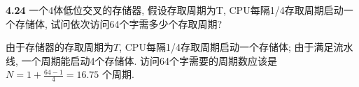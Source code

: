 \documentclass[UTF8]{report}
\newcommand{\problem}[1]{{\setlength{\parskip}{10pt}\noindent \bf{#1}}}
\newenvironment{solution}{{\noindent\hskip 2em \bf 解 \quad}}{}
\begin{document}
\problem{4.24} 一个4体低位交叉的存储器, 假设存取周期为T, CPU每隔1/4存取周期启动一个存储体, 试问依次访问64个字需多少个存取周期?

\begin{solution}
    由于存储器的存取周期为$T$, CPU每隔1/4存取周期启动一个存储体; 由于满足流水线, 一个周期能启动4个存储体. 访问64个字需要的周期数应该是 $N = 1 + \frac{64-1}{4} = 16.75$ 个周期.
\end{solution}
\end{document}
